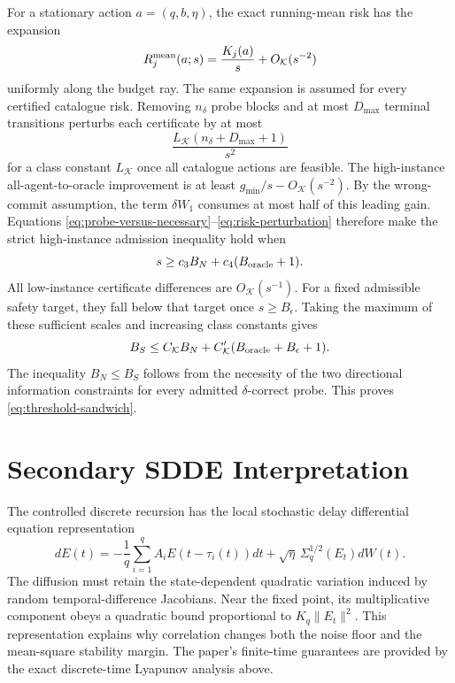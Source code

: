 For a stationary action $a=(q,b,\eta)$, the exact running-mean risk has the expansion
\begin{equation}
R_j^{\rm mean}(a;s)=\frac{K_j(a)}{s}+O_{\mathcal K}(s^{-2})
\end{equation}
uniformly along the budget ray.
The same expansion is assumed for every certified catalogue risk.
Removing $n_\delta$ probe blocks and at most $D_{\max}$ terminal transitions perturbs each certificate by at most
\begin{equation}
\frac{L_{\mathcal K}(n_\delta+D_{\max}+1)}{s^2}
\label{eq:risk-perturbation}
\end{equation}
for a class constant $L_{\mathcal K}$ once all catalogue actions are feasible.
The high-instance all-agent-to-oracle improvement is at least $g_{\min}/s-O_{\mathcal K}(s^{-2})$.
By the wrong-commit assumption, the term $\delta W_1$ consumes at most half of this leading gain.
Equations \eqref{eq:probe-versus-necessary}--\eqref{eq:risk-perturbation} therefore make the strict high-instance admission inequality hold when
\begin{equation}
s\ge c_3B_N+c_4(B_{\rm oracle}+1).
\end{equation}
All low-instance certificate differences are $O_{\mathcal K}(s^{-1})$.
For a fixed admissible safety target, they fall below that target once $s\ge B_\epsilon$.
Taking the maximum of these sufficient scales and increasing class constants gives
\begin{equation}
B_S\le C_{\mathcal K}B_N+C'_{\mathcal K}(B_{\rm oracle}+B_\epsilon+1).
\end{equation}
The inequality $B_N\le B_S$ follows from the necessity of the two directional information constraints for every admitted $\delta$-correct probe.
This proves \eqref{eq:threshold-sandwich}.

\section{Secondary SDDE Interpretation}
The controlled discrete recursion has the local stochastic delay differential equation representation
\begin{equation}
dE(t)=-\frac1q\sum_{i=1}^{q}A_iE(t-\tau_i(t))dt+\sqrt{\eta}\,\Sigma_q^{1/2}(E_t)dW(t).
\end{equation}
The diffusion must retain the state-dependent quadratic variation induced by random temporal-difference Jacobians.
Near the fixed point, its multiplicative component obeys a quadratic bound proportional to $K_q\|E_t\|^2$.
This representation explains why correlation changes both the noise floor and the mean-square stability margin.
The paper's finite-time guarantees are provided by the exact discrete-time Lyapunov analysis above.
